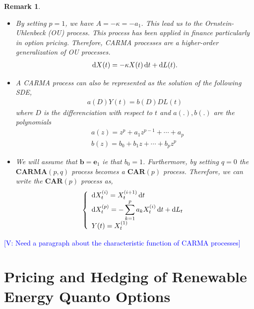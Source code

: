 \documentclass[10pt,a4paper,reqno]{amsart}
\newtheorem{remark}[theorem]{Remark}
\theoremstyle{example}
\newcommand*\D{\mathop{}\!\textnormal{d}}
\newcommand{\vincent}[1]{\textcolor{blue}{[V: #1]}}
\begin{document}
\begin{remark}
\noindent
\begin{itemize}
\item[--]By setting $p = 1$, we have $A=-\kappa = -a_1$. This lead us to the Ornstein-Uhlenbeck (OU) process. This process has been applied in finance particularly in option pricing. Therefore, CARMA processes are a higher-order generalization of OU processes. 
    \begin{align*} 
    \D X(t) = -\kappa X(t)\D t + \D L(t).      
    \end{align*}
\item[--] A CARMA process can also be represented as the solution of the following SDE,
    \begin{align*}
        a(D)Y(t)=b(D)DL(t)
    \end{align*}
    \noindent
    where $D$ is the differenciation with respect to $t$ and $a(.), b(.)$ are the polynomials
    \begin{align*}
        &a(z) = z^p + a_1z^{p-1}+\cdots+a_p\\
        &b(z) = b_0 + b_1z+ \cdots + b_pz^p
    \end{align*}
\item[--] We will assume that $\mathbf{b}=\textbf{e}_1$ ie that $b_0=1$. Furthermore, by setting $q=0$ the $\textbf{CARMA}(p,q)$ process becomes a $\textbf{CAR}(p)$ process. Therefore, we can write the $\textbf{CAR}(p)$ process as,
\begin{align*}
\left\{
\begin{array}{l}
\D X_t^{(i)}=X_t^{(i+1)}\D t  \\
\D X_t^{(p)}=-\displaystyle\sum_{k=1}^p a_kX_t^{(i)}\D t  + \D L_t \\
Y(t)=X_t^{(1)}
\end{array}
\right.
\end{align*} 
\end{itemize}
\end{remark}
\noindent
\vincent{Need a paragraph about the characteristic function of CARMA processes}
\section{Pricing and Hedging of Renewable Energy Quanto Options}
\end{document}
